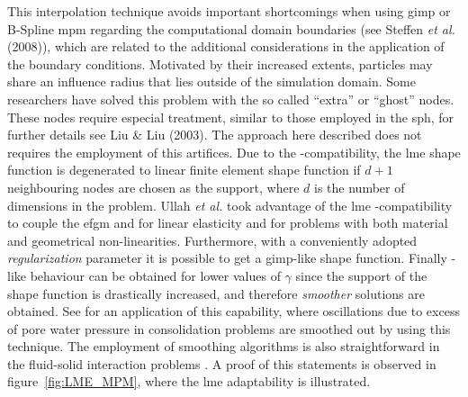 \documentclass[preprint,12pt,a4paper]{elsarticle}
\begin{document}
This interpolation technique avoids important shortcomings when using
\acrshort{gimp} or B-Spline \acrshort{mpm} regarding the computational domain boundaries
(see Steffen {\it et al.} (2008)\cite{Steffen2008b}), which are related to the
additional considerations in the application of the boundary
conditions. Motivated by their increased extents, particles may share an influence radius that lies outside of the simulation domain. Some researchers have solved this problem with the so called ``extra'' or ``ghost'' nodes. These nodes require especial treatment, similar
to those employed in the \acrfull{sph}, for
further details see Liu \& Liu (2003)\cite{Liu2003}. The approach here
described does not requires the employment of this artifices.
Due to the -compatibility, the \acrshort{lme} shape
function is degenerated to linear finite element shape function if
$d+1$ neighbouring nodes are chosen as the support, where $d$ is the
number of dimensions in the problem. Ullah {\it et al.}
  \cite{Augarde_2013} took advantage of the \acrshort{lme}
  -compatibility to couple the
     \acrfull{efgm} and  for linear elasticity and for problems with both material and geometrical non-linearities. Furthermore, with a conveniently
adopted \textit{regularization} parameter it is possible to get a 
\acrshort{gimp}-like shape function. Finally -like
behaviour can be obtained for lower values of $\gamma$ since the
support of the shape function is drastically increased, and therefore
\textit{smoother} solutions are obtained. See \cite{Navas2016} for an
application of this capability, where oscillations due to
excess of pore water pressure in consolidation problems are smoothed
out by using this technique. The employment of smoothing algorithms is
also straightforward in the fluid-solid interaction problems
\cite{Arduino_2018}. A proof of this statements is observed in
figure~\ref{fig:LME_MPM}, where the \acrshort{lme} adaptability is illustrated.\\
\end{document}
